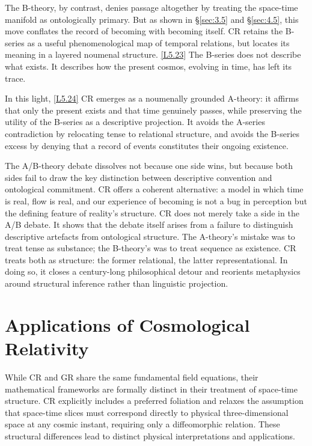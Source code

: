 \documentclass[12pt]{book}
\newcounter{logicanchor}
\newenvironment{logicanchorenv}[1]{\refstepcounter{logicanchor}\label{#1}}{}
\newcommand{\logiclink}[2]{\begin{logicanchorenv}{logic:#1}\end{logicanchorenv}\hyperref[appendix:#1]{[#1]}\xspace}
\begin{document}
The B-theory, by contrast, denies passage altogether by treating the space-time manifold as ontologically primary. But as shown in \S\ref{sec:3.5} and \S\ref{sec:4.5}, this move conflates the record of becoming with becoming itself. CR retains the B-series as a useful phenomenological map of temporal relations, but locates its meaning in a layered noumenal structure. \logiclink{L5.23}{} The B-series does not describe what exists. It describes how the present cosmos, evolving in time, has left its trace.

In this light, \logiclink{L5.24}{} CR emerges as a noumenally grounded A-theory: it affirms that only the present exists and that time genuinely passes, while preserving the utility of the B-series as a descriptive projection. It avoids the A-series contradiction by relocating tense to relational structure, and avoids the B-series excess by denying that a record of events constitutes their ongoing existence.

The A/B-theory debate dissolves not because one side wins, but because both sides fail to draw the key distinction between descriptive convention and ontological commitment. CR offers a coherent alternative: a model in which time is real, flow is real, and our experience of becoming is not a bug in perception but the defining feature of reality's structure. CR does not merely take a side in the A/B debate. It shows that the debate itself arises from a failure to distinguish descriptive artefacts from ontological structure. The A-theory's mistake was to treat tense as substance; the B-theory's was to treat sequence as existence. CR treats both as structure: the former relational, the latter representational. In doing so, it closes a century-long philosophical detour and reorients metaphysics around structural inference rather than linguistic projection.

\section{Applications of Cosmological Relativity}\label{sec:5.4}

While CR and GR share the same fundamental field equations, their mathematical frameworks are formally distinct in their treatment of space-time structure. CR explicitly includes a preferred foliation and relaxes the assumption that space-time slices must correspond directly to physical three-dimensional space at any cosmic instant, requiring only a diffeomorphic relation. These structural differences lead to distinct physical interpretations and applications.
\end{document}
